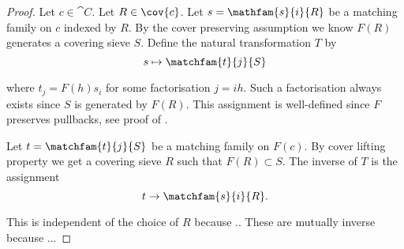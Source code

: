 
\begin{proof}
Let $c \in \cat{C}$.
Let $R \in \cov{c}$.
Let $s = \mathfam{s}{i}{R}$ be a matching family on $c$ indexed by $R$.
By the cover preserving assumption we know $F(R)$ generates a covering sieve $S$.
Define the natural transformation $T$ by 
\[ s \mapsto \matchfam{t}{j}{S} \]

where $t_j = F(h)s_i$ for some factorisation $j=ih$. 
Such a factorisation always exists since $S$ is generated by $F(R)$.
This assignment is well-defined since $F$ preserves pullbacks, see proof of \cite[Lemma 2.3.3]{elephant}.

Let $t=\matchfam{t}{j}{S}$ be a matching family on $F(c)$.
By cover lifting property we get a covering sieve $R$ such that $F(R)\subset S$.
The inverse of $T$ is the assignment
\[ t \to \matchfam{s}{i}{R}.\]

This is independent of the choice of $R$ because ..
These are mutually inverse because ...
\end{proof}
